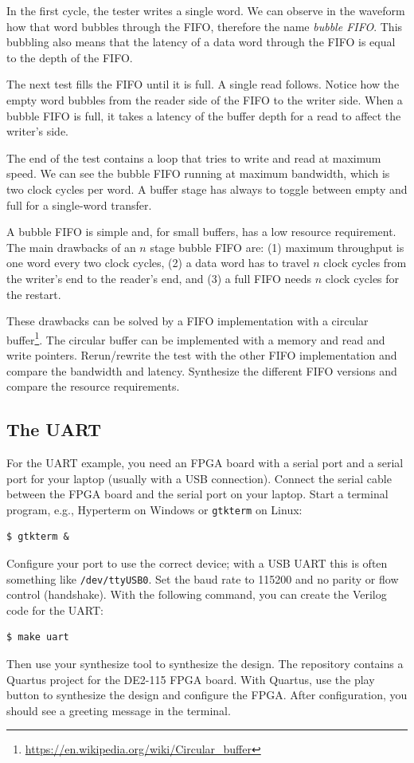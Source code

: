\documentclass[%
    10pt,
    headinclude, footinclude=false,
    openright, %
    notitlepage,
    cleardoublepage=empty,
    headsepline,
    numbers=noenddot,
    bibliography=totoc, index=totoc,
    ]{scrbook}
\newcommand{\code}[1]{{\lstinline[basicstyle=\small\ttfamily]{#1}}}
\newcommand{\myref}[2]{\href{#1}{#2}}
\renewcommand{\myref}[2]{{#2}{\footnote{\url{#1}}}}
\begin{document}
In the first cycle, the tester writes a single word. We can observe in
the waveform how that word bubbles through the FIFO, therefore the
name \emph{bubble FIFO}. This bubbling also means that the
latency of a data word through the FIFO is equal to the depth of the FIFO.

The next test fills the FIFO until it is full. A single read follows.
Notice how the empty word bubbles from the reader side of the FIFO
to the writer side. When a bubble FIFO is full, it takes
a latency of the buffer depth for a read to affect the writer's side.

The end of the test contains a loop that tries to write and read at maximum speed.
We can see the bubble FIFO running at maximum bandwidth, which is two
clock cycles per word. A buffer stage has always to toggle between empty
and full for a single-word transfer.

A bubble FIFO is simple and, for small buffers, has a low resource requirement.
The main drawbacks of an $n$ stage bubble FIFO are: (1) maximum throughput is
one word every two clock cycles, (2) a data word has to travel $n$ clock cycles
from the writer's end to the reader's end, and (3) a full FIFO needs $n$ clock cycles
for the restart.

These drawbacks can be solved by a FIFO implementation with a
\myref{https://en.wikipedia.org/wiki/Circular_buffer}{circular buffer}.
The circular buffer can be implemented with a memory and
read and write pointers.
Rerun/rewrite the test with the other FIFO implementation and compare
the bandwidth and latency. Synthesize the different FIFO versions and compare
the resource requirements.

\subsection{The UART}

For the UART example, you need an FPGA board with a serial port and
a serial port for your laptop (usually with a USB connection).
Connect the serial cable between the FPGA board and the serial port on
your laptop. Start a terminal program, e.g., Hyperterm on Windows
or \code{gtkterm} on Linux:
\begin{verbatim}
$ gtkterm &
\end{verbatim}
Configure your port to use the correct device; with a USB UART this
is often something like \code{/dev/ttyUSB0}. Set the baud rate to 115200
and no parity or flow control (handshake).
With the following command, you can create the Verilog code for the UART:
\begin{verbatim}
$ make uart
\end{verbatim}
Then use your synthesize tool to synthesize the design.
The repository contains a Quartus project for the DE2-115 FPGA board.
With Quartus, use the play button to synthesize the design and configure
the FPGA.
After configuration, you should see a greeting message in the terminal.
\end{document}
